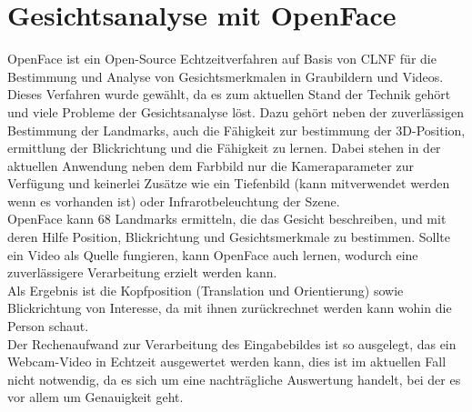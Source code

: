 \section{Gesichtsanalyse mit OpenFace}
\label{OpenFace}
OpenFace ist ein Open-Source Echtzeitverfahren auf Basis von CLNF für die Bestimmung und Analyse von Gesichtsmerkmalen in Graubildern und Videos. Dieses Verfahren wurde gewählt, da es zum aktuellen Stand der Technik gehört und viele Probleme der Gesichtsanalyse löst. Dazu gehört neben der zuverlässigen Bestimmung der Landmarks, auch die Fähigkeit zur bestimmung der 3D-Position, ermittlung der Blickrichtung und die Fähigkeit zu lernen. Dabei stehen in der aktuellen Anwendung neben dem Farbbild nur die Kameraparameter zur Verfügung und keinerlei Zusätze wie ein Tiefenbild (kann mitverwendet werden wenn es vorhanden ist) oder Infrarotbeleuchtung der Szene.\\
OpenFace kann 68 Landmarks ermitteln, die das Gesicht beschreiben, und mit deren Hilfe Position, Blickrichtung und Gesichtsmerkmale zu bestimmen. Sollte ein Video als Quelle fungieren, kann OpenFace auch lernen, wodurch eine zuverlässigere Verarbeitung erzielt werden kann.\\
Als Ergebnis ist die Kopfposition (Translation und Orientierung) sowie Blickrichtung von Interesse, da mit ihnen zurückrechnet werden kann wohin die Person schaut.\\
Der Rechenaufwand zur Verarbeitung des Eingabebildes ist so ausgelegt, das ein Webcam-Video in Echtzeit ausgewertet werden kann, dies ist im aktuellen Fall nicht notwendig, da es sich um eine nachträgliche Auswertung handelt, bei der es vor allem um Genauigkeit geht.
